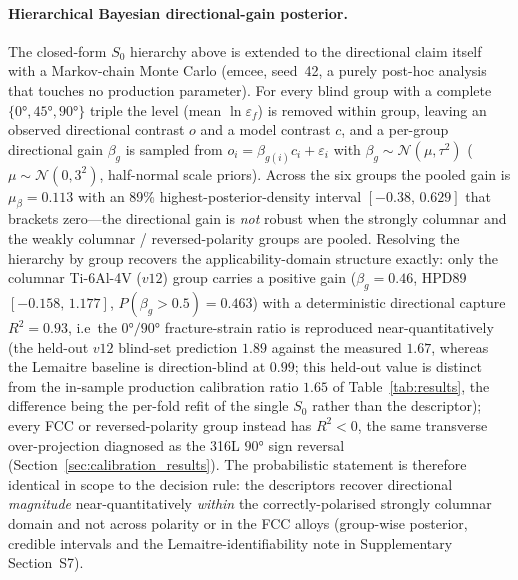 \documentclass[twocolumn]{sagej}
\begin{document}
\paragraph{Hierarchical Bayesian directional-gain posterior.} The closed-form $S_0$ hierarchy above is extended to the directional claim itself with a Markov-chain Monte Carlo (emcee, seed~42, a purely post-hoc analysis that touches no production parameter). For every blind group with a complete $\{\ang{0},\ang{45},\ang{90}\}$ triple the level (mean $\ln\varepsilon_f$) is removed within group, leaving an observed directional contrast $o$ and a model contrast $c$, and a per-group directional gain $\beta_g$ is sampled from $o_i = \beta_{g(i)} c_i + \varepsilon_i$ with $\beta_g \sim \mathcal{N}(\mu,\tau^2)$ ($\mu\sim\mathcal{N}(0,3^2)$, half-normal scale priors). Across the six groups the pooled gain is $\mu_\beta = 0.113$ with an 89\% highest-posterior-density interval $[-0.38,\,0.629]$ that brackets zero---the directional gain is \emph{not} robust when the strongly columnar and the weakly columnar / reversed-polarity groups are pooled. Resolving the hierarchy by group recovers the applicability-domain structure exactly: only the columnar Ti-6Al-4V ($v12$) group carries a positive gain ($\beta_g = 0.46$, HPD89 $[-0.158,\,1.177]$, $P(\beta_g > 0.5) = 0.463$) with a deterministic directional capture $R^2 = 0.93$, i.e\ the $\ang{0}/\ang{90}$ fracture-strain ratio is reproduced near-quantitatively (the held-out $v12$ blind-set prediction $1.89$ against the measured $1.67$, whereas the Lemaitre baseline is direction-blind at $0.99$; this held-out value is distinct from the in-sample production calibration ratio $1.65$ of Table~\ref{tab:results}, the difference being the per-fold refit of the single $S_0$ rather than the descriptor); every FCC or reversed-polarity group instead has $R^2 < 0$, the same transverse over-projection diagnosed as the 316L $\ang{90}$ sign reversal (Section~\ref{sec:calibration_results}). The probabilistic statement is therefore identical in scope to the decision rule: the descriptors recover directional \emph{magnitude} near-quantitatively \emph{within} the correctly-polarised strongly columnar domain and not across polarity or in the FCC alloys (group-wise posterior, credible intervals and the Lemaitre-identifiability note in Supplementary Section~S7).
\end{document}
